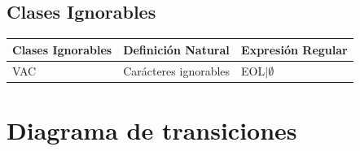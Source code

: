 \documentclass{article}
\begin{document}
\subsection{Clases Ignorables}
\begin{center}
    \begin{tabular}{ | p{2cm} | p{5cm} | p{4cm} |}
    \hline
    Clases Ignorables & Definición Natural & Expresión Regular \\ \hline
    VAC & Carácteres ignorables & EOL$\mid \emptyset$ \\ \hline
    \end{tabular}
\end{center}

\newpage

\section{Diagrama de transiciones}
\end{document}

